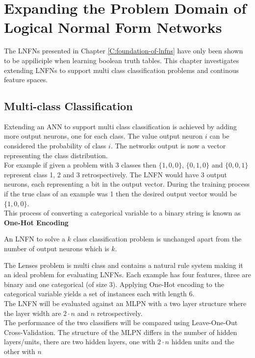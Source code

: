 \chapter{Expanding the Problem Domain of Logical Normal Form Networks} \label{C:investigation-of-lnfns}
The LNFNs presented in Chapter \ref{C:foundation-of-lnfns} have only been shown to be appiliciple when learning boolean truth tables. This chapter investigates extending LNFNs to support multi class classification problems and continous feature spaces.

\section{Multi-class Classification}
Extending an ANN to support multi class classification is achieved by adding more output neurons, one for each class. The value output neuron $i$ can be considered the probability of class $i$. The networks output is now a vector representing the class distribution. \\

For example if given a problem with 3 classes then $\{1,0,0\}$, $\{0,1,0\}$ and $\{0,0,1\}$ represent class 1, 2 and 3 retrospectively. The LNFN would have 3 output neurons, each representing a bit in the output vector. During the training process if the true class of an example was 1 then the desired output vector would be $\{1,0,0\}$.\\

This process of converting a categorical variable to a binary string is known as \textbf{One-Hot Encoding}

\begin{definition}
	An LNFN to solve a $k$ class classification problem is unchanged apart from the number of output neurons which is $k$.
\end{definition}

The Lenses problem \cite{Lichman:2013} is multi class and contains a natural rule system making it an ideal problem for evaluating LNFNs. Each example has four features, three are binary and one categorical (of size 3). Applying One-Hot encoding to the categorical variable yields a set of instances each with length 6.\\

The LNFN will be evaluated against an MLPN with a two layer structure where the layer width are $2 \cdot n$ and $n$ retrospectively.\\

The performance of the two classifiers will be compared using Leave-One-Out Cross-Validation. The structure of the MLPN differs in the number of hidden layers/units, there are two hidden layers, one with $2 \cdot n$ hidden units and the other with $n$

